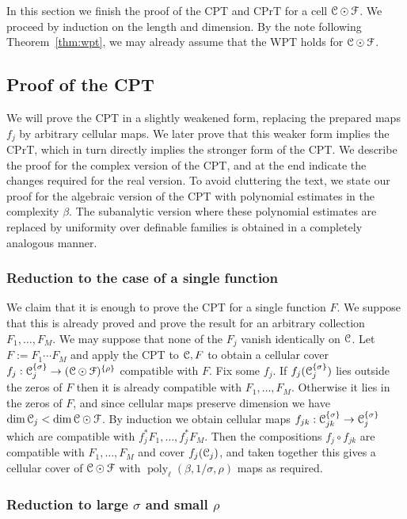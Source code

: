 \documentclass[reqno]{amsart}
\renewcommand\~[1]{\widetilde{#1}}
\def\poly{\operatorname{poly}} \def\J{\operatorname{J}}
\def\cF{{\mathcal F}} \def\cL{{\mathcal L}} \def\cR{{\mathcal R}}
\def\he#1{{\{#1\}}}
\def\hrho{{\he\rho}}
\def\hsigma{{\he\sigma}}
\begin{document}
In this section we finish the proof of the CPT and CPrT for a cell
$\cC\odot\cF$. We proceed by induction on the length and dimension. By
the note following Theorem~\ref{thm:wpt}, we may already assume that
the WPT holds for $\cC\odot\cF$.

\subsection{Proof of the CPT}

We will prove the CPT in a slightly weakened form, replacing the
prepared maps $f_j$ by arbitrary cellular maps. We later prove that
this weaker form implies the CPrT, which in turn directly implies the
stronger form of the CPT. We describe the proof for the complex
version of the CPT, and at the end indicate the changes required for
the real version. To avoid cluttering the text, we state our proof for
the algebraic version of the CPT with polynomial estimates in the
complexity $\beta$. The subanalytic version where these polynomial
estimates are replaced by uniformity over definable families is
obtained in a completely analogous manner.

\subsubsection{Reduction to the case of a single function}
\label{sec:cpt-single-F}

We claim that it is enough to prove the CPT for a single function
$F$. We suppose that this is already proved and prove the result for
an arbitrary collection $F_1,\ldots,F_M$. We may suppose that none of
the $F_j$ vanish identically on ${\mathcal C}$. Let $F:=F_1\cdots F_M$ and
apply the CPT to ${\mathcal C},F$ to obtain a cellular cover
$f_j:\cC_j^\hsigma\to(\cC\odot\cF)^\hrho$ compatible with $F$. Fix
some $f_j$. If $f_j(\cC_j^\hsigma)$ lies outside the zeros of $F$ then
it is already compatible with $F_1,\ldots,F_M$.  Otherwise it lies in
the zeros of $F$, and since cellular maps preserve dimension we have
$\dim\cC_j<\dim\cC\odot\cF$. By induction we obtain cellular maps
$f_{jk}:\cC_{jk}^\hsigma\to\cC_j^\hsigma$ which are compatible with
$f_j^*F_1,\ldots,f_j^*F_M$. Then the compositions $f_j\circ f_{jk}$
are compatible with $F_1,\ldots,F_M$ and cover $f_j({\mathcal C}_j)$, and taken
together this gives a cellular cover of $\cC\odot\cF$ with
$\poly_\ell(\beta,1/\sigma,\rho)$ maps as required.

\subsubsection{Reduction to large $\sigma$ and small $\rho$}
\label{sec:cpt-refine-sigma-rho}
\end{document}
